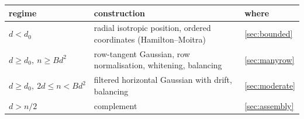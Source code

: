 \begin{center}
\small
\begin{tabular}{@{}lll@{}}
\toprule
regime & construction & where\\
\midrule
$d<d_0$ & radial isotropic position, ordered coordinates (Hamilton--Moitra) & \cref{sec:bounded}\\
$d\ge d_0,\ n\ge Bd^2$ & row-tangent Gaussian, row normalisation, whitening, balancing & \cref{sec:manyrow}\\
$d\ge d_0,\ 2d\le n<Bd^2$ & filtered horizontal Gaussian with drift, balancing & \cref{sec:moderate}\\
$d>n/2$ & complement & \cref{sec:assembly}\\
\bottomrule
\end{tabular}
\end{center}
